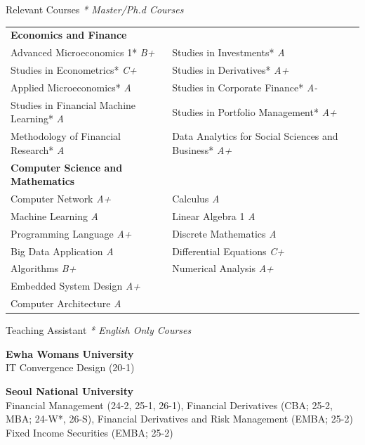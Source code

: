 \documentclass{resume} %
\begin{document}
\begin{rSection}{Relevant Courses}
\textit{* Master/Ph.d Courses}


\begin{tabular}{p{} p{}}


\textbf{Economics and Finance} \\
Advanced Microeconomics 1* \hfill {\em B+} & Studies in Investments* \hfill {\em A} \\
Studies in Econometrics* \hfill {\em C+} & Studies in Derivatives* \hfill {\em A+} \\
Applied Microeconomics* \hfill {\em A} & Studies in Corporate Finance* \hfill {\em A-}  \\
Studies in Financial Machine Learning* \hfill {\em A} & Studies in Portfolio Management* \hfill {\em A+} \\
Methodology of Financial Research* \hfill {\em A} & Data Analytics for Social Sciences and Business* \hfill {\em A+} \\
[10pt]

\textbf{Computer Science and Mathematics}  \\
Computer Network \hfill {\em A+} & Calculus \hfill {\em A} \\
Machine Learning \hfill {\em A} & Linear Algebra 1 \hfill {\em A} \\
Programming Language \hfill {\em A+} & Discrete Mathematics \hfill {\em A} \\
Big Data Application \hfill {\em A} & Differential Equations \hfill {\em C+} \\
Algorithms	 \hfill {\em B+} & Numerical Analysis \hfill {\em A+} \\
Embedded System Design \hfill {\em A+} & \\
Computer Architecture \hfill {\em A} & \\


\end{tabular}
\end{rSection}


\begin{rSection}{Teaching Assistant}
\textit{* English Only Courses}

{\bf Ewha Womans University}
\\  IT Convergence Design (20-1)

{\bf Seoul National University}
\\ Financial Management (24-2, 25-1, 26-1), Financial Derivatives (CBA; 25-2, MBA; 24-W*, 26-S), Financial Derivatives and Risk Management (EMBA; 25-2) Fixed Income Securities (EMBA; 25-2)

\end{rSection}
\end{document}
